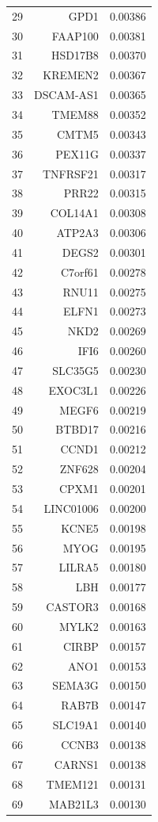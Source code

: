 \begin{longtable}{crr}
29 & GPD1 & 0.00386 \\
30 & FAAP100 & 0.00381 \\
31 & HSD17B8 & 0.00370 \\
32 & KREMEN2 & 0.00367 \\
33 & DSCAM-AS1 & 0.00365 \\
34 & TMEM88 & 0.00352 \\
35 & CMTM5 & 0.00343 \\
36 & PEX11G & 0.00337 \\
37 & TNFRSF21 & 0.00317 \\
38 & PRR22 & 0.00315 \\
39 & COL14A1 & 0.00308 \\
40 & ATP2A3 & 0.00306 \\
41 & DEGS2 & 0.00301 \\
42 & C7orf61 & 0.00278 \\
43 & RNU11 & 0.00275 \\
44 & ELFN1 & 0.00273 \\
45 & NKD2 & 0.00269 \\
46 & IFI6 & 0.00260 \\
47 & SLC35G5 & 0.00230 \\
48 & EXOC3L1 & 0.00226 \\
49 & MEGF6 & 0.00219 \\
50 & BTBD17 & 0.00216 \\
51 & CCND1 & 0.00212 \\
52 & ZNF628 & 0.00204 \\
53 & CPXM1 & 0.00201 \\
54 & LINC01006 & 0.00200 \\
55 & KCNE5 & 0.00198 \\
56 & MYOG & 0.00195 \\
57 & LILRA5 & 0.00180 \\
58 & LBH & 0.00177 \\
59 & CASTOR3 & 0.00168 \\
60 & MYLK2 & 0.00163 \\
61 & CIRBP & 0.00157 \\
62 & ANO1 & 0.00153 \\
63 & SEMA3G & 0.00150 \\
64 & RAB7B & 0.00147 \\
65 & SLC19A1 & 0.00140 \\
66 & CCNB3 & 0.00138 \\
67 & CARNS1 & 0.00138 \\
68 & TMEM121 & 0.00131 \\
69 & MAB21L3 & 0.00130 \\

\end{longtable}
